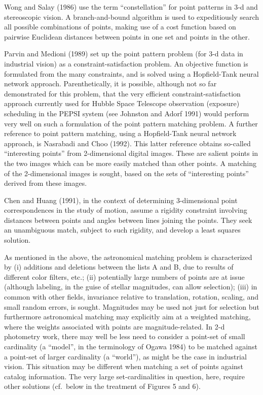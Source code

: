 Wong and Salay (1986) use the term ``constellation'' for point patterns in
3-d and stereoscopic vision.  A branch-and-bound algorithm is used to 
expeditiously search all possible combinations of points, making use of a
cost function based on pairwise Euclidean distances between 
points in one set and points in the other.

Parvin and Medioni (1989) set up the point pattern problem (for 3-d data
in industrial vision) as a constraint-satisfaction problem.  An objective 
function is
formulated from the many constraints, and is solved using
a Hopfield-Tank neural network approach.  Parenthetically, it is possible, 
although not so far demonstrated for this problem, that 
the very efficient constraint-satisfaction
approach currently used for Hubble Space Telescope observation 
(exposure) scheduling in the PEPSI system (see Johnston and Adorf 1991) 
would perform very well on such a formulation of the point pattern
matching problem.   A further reference to point pattern matching, using
a Hopfield-Tank neural network approach, is Nasrabadi and Choo (1992).
This latter reference obtains so-called ``interesting points'' from 
2-dimensional digital images.  These are salient points in the two images
which can be more easily matched than other points.  A matching of the 
2-dimensional images is sought, based on the sets of ``interesting points''
derived from these images.

Chen and Huang (1991), in the context of determining 3-dimensional
point correspondences in the study of motion, assume a rigidity constraint
involving distances between points and angles between lines joining the 
points.  They seek an unambiguous match, subject to such rigidity, and 
develop a least squares solution.

As mentioned in the above, the astronomical matching problem is
characterized by (i) additions and deletions between the lists A and B,
due to results of different color filters, etc.;
(ii) potentially large numbers of points are at issue (although labeling, 
in the guise
of stellar magnitudes, can allow selection); (iii) in common with other
fields, invariance relative to translation, rotation, scaling, and 
small random errors, is sought. Magnitudes may be used not just for selection
but furthermore  astronomical matching may explicitly aim at a weighted
matching, where the weights associated with points
are magnitude-related.  In 2-d photometry work, there may well be less 
need to consider
a point-set of small cardinality (a ``model'', in the terminology of 
Ogawa 1984) to be matched against a
point-set of larger cardinality (a ``world''), as might be the case in
industrial vision.  This situation may be different when 
matching a set of points against catalog 
information. The very large 
set-cardinalities in question, here, require other solutions (cf.\ below in the
treatment of Figures 5 and 6).


